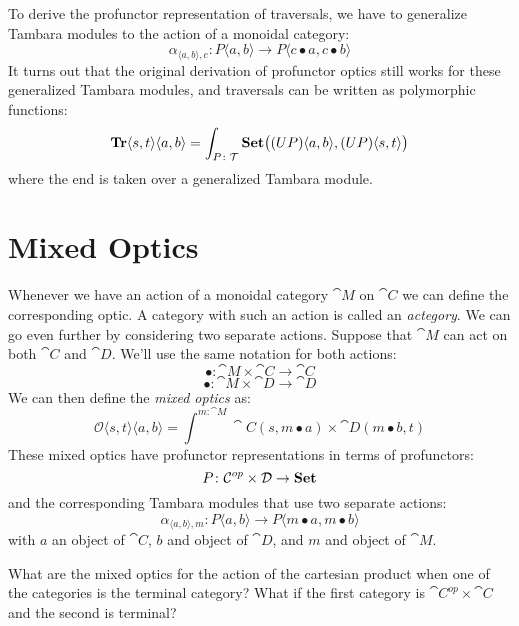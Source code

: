 \documentclass[DaoFP]{subfiles}
\begin{document}
To derive the profunctor representation of traversals, we have to generalize Tambara modules to the action of a monoidal category:
\[ \alpha_{\langle a, b\rangle, c} \colon P \langle a, b \rangle \to P \langle c \bullet a, c \bullet b \rangle \]
It turns out that the original derivation of profunctor optics still works for these generalized Tambara modules, and traversals can be written as polymorphic functions:
\[  \mathbf{Tr}\langle s, t \rangle \langle a, b \rangle 
 =\int_{P \colon \mathcal{T}} \mathbf{Set} \big((U P) \langle a, b\rangle, (U P) \langle s, t\rangle \big) \]
where the end is taken over a generalized Tambara module.

\section{Mixed Optics}

Whenever we have an action of a monoidal category $\cat M$ on $\cat C$ we can define the corresponding optic. A category with such an action is called an \emph{actegory}. We can go even further by considering two separate actions. Suppose that $\cat M$ can act on both $\cat C$ and $\cat D$. We'll use the same notation for both actions:
\[ \bullet \colon \cat M \times \cat C \to \cat C \]
\[ \bullet \colon \cat M \times \cat D \to \cat D \]
We can then define the \emph{mixed optics} as:
\[ \mathcal{O} \langle s, t \rangle \langle a, b \rangle = \int^{m \colon \cat M} \cat C(s, m \bullet a) \times \cat D(m \bullet b, t) \]
These mixed optics have profunctor representations in terms of profunctors:
\[ P \colon \mathcal{C} ^{op} \times \mathcal{D} \to \mathbf{Set} \]
and the corresponding Tambara modules that use two separate actions:
\[ \alpha_{\langle a, b\rangle, m} \colon P \langle a, b \rangle \to P \langle m \bullet a, m \bullet b \rangle \]
with $a$ an object of $\cat C$, $b$ and object of $\cat D$, and $m$ and object of $\cat M$.

\begin{exercise}
What are the mixed optics for the action of the cartesian product when one of the categories is the terminal category? What if the first category is $\cat C^{op} \times \cat C$ and the second is terminal?
\end{exercise}
\end{document}
